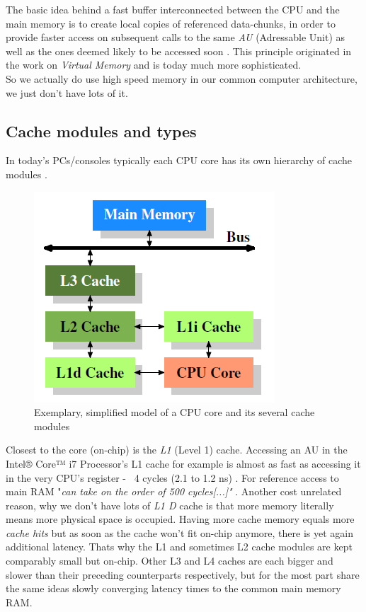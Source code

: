 The basic idea behind a fast buffer interconnected between the CPU and the main memory is to create local copies of referenced data-chunks, in order to provide faster access on subsequent calls to the same \textit{AU} (Adressable Unit) as well as the ones deemed likely to be accessed soon . This principle originated in the work on \textit{Virtual Memory}  and is today much more sophisticated.\\
So we actually do use high speed memory in our common computer architecture, we just don't have lots of it.

\subsection{Cache modules and types}
In today's PCs/consoles typically each CPU core has its own hierarchy of cache modules .
\begin{figure}[!htbp]
	\centering
	\includegraphics[width=0.4\linewidth]{PICs/cachelayout}
	\caption{Exemplary, simplified model of a CPU core and its several cache modules }\label{cache_layout}
\end{figure}
Closest to the core (on-chip) is the \textit{L1} (Level 1) cache. Accessing an AU in the  Intel® Core™ i7 Processor's L1 cache for example is almost as fast as accessing it in the very CPU's register - ~4 cycles (2.1 to 1.2 ns) . For reference access to main RAM "\textit{can take on the order of 500 cycles[...]"} .
Another cost unrelated reason, why we don't have lots of \textit{L1 D} cache is that more memory literally means more physical space is occupied. Having more cache memory equals more \textit{cache hits}  but as soon as the cache won't fit on-chip anymore, there is yet again additional latency. Thats why the L1 and sometimes L2 cache modules are kept comparably small but on-chip. Other L3 and L4 caches are each bigger and slower than their preceding counterparts respectively, but for the most part share the same ideas slowly converging latency times to the common main memory RAM.\\
